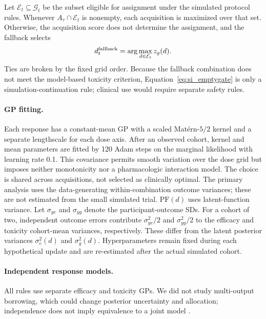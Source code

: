 \documentclass[11pt]{article}
\newcommand{\rev}[1]{{#1}}
\newcommand{\revisioncolor}{}
\newcommand{\PF}{\mathrm{PF}}
\begin{document}
{\revisioncolor
Let $\mathcal E_t\subseteq\mathcal G_t$ be the subset eligible for assignment under the simulated protocol rules. Whenever $A_\tau\cap\mathcal E_t$ is nonempty, each acquisition is maximized over that set. Otherwise, the acquisition score does not determine the assignment, and the fallback selects
\begin{equation}\label{eq:si_emptygate}
d_t^{\rm fallback}=\arg\max_{d\in\mathcal E_t}z_g(d).
\end{equation}
Ties are broken by the fixed grid order. Because the fallback combination does not meet the model-based toxicity criterion, Equation~\eqref{eq:si_emptygate} is only a simulation-continuation rule; clinical use would require separate safety rules.

}

\paragraph{GP fitting.} Each response has a constant-mean GP with a scaled Mat\'ern-$5/2$ kernel and a separate lengthscale for each dose axis. After an observed cohort, kernel and mean parameters are fitted by 120 Adam steps on the marginal likelihood with learning rate 0.1. This covariance permits smooth variation over the dose grid but imposes neither monotonicity nor a pharmacologic interaction model. The choice is shared across acquisitions, not selected as clinically optimal. The primary analysis uses the data-generating within-combination outcome variances; these are not estimated from the small simulated trial. $\PF(d)$ uses latent-function variance. \rev{Let $\sigma_{ye}$ and $\sigma_{yg}$ denote the participant-outcome SDs. For a cohort of two, independent outcome errors contribute $\sigma_{ye}^2/2$ and $\sigma_{yg}^2/2$ to the efficacy and toxicity cohort-mean variances, respectively. These differ from the latent posterior variances $\sigma_e^2(d)$ and $\sigma_g^2(d)$.} Hyperparameters remain fixed during each hypothetical update and are re-estimated after the actual simulated cohort.

\paragraph{Independent response models.} \rev{All rules use separate efficacy and toxicity GPs. We did not study multi-output borrowing, which could change posterior uncertainty and allocation; independence does not imply equivalence to a joint model} \citep{bonilla2007,alvarez2012}.
\end{document}
